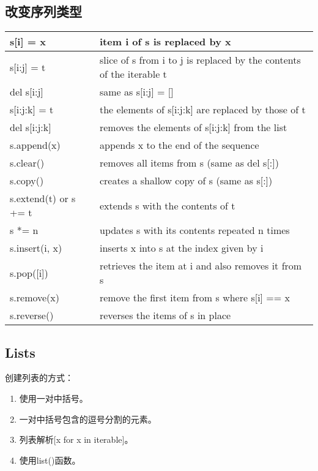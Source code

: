 \subsection{改变序列类型}
\begin{center}
  \begin{tabular}{|l|l|} \hline
    s[i] = x         & item i of s is replaced by x \\\hline
    s[i:j] = t       & slice of s from i to j is replaced by the contents of the iterable t \\\hline
    del s[i:j]       & same as s[i:j] = [] \\\hline
    s[i:j:k] = t     & the elements of s[i:j:k] are replaced by those of t \\\hline
    del s[i:j:k]     & removes the elements of s[i:j:k] from the list \\\hline
    s.append(x)      & appends x to the end of the sequence \\\hline
    s.clear()        & removes all items from s (same as del s[:]) \\\hline
    s.copy()         & creates a shallow copy of s (same as s[:]) \\\hline
    s.extend(t) or s += t & extends s with the contents of t \\\hline
    s *= n           & updates s with its contents repeated n times \\\hline
    s.insert(i, x)   & inserts x into s at the index given by i \\\hline
    s.pop([i])       & retrieves the item at i and also removes it from s \\\hline
    s.remove(x)      & remove the first item from s where s[i] == x \\\hline
    s.reverse()      & reverses the items of s in place \\\hline

  \end{tabular}
\end{center}



\subsection{Lists}
\noindent{\color{red}{list([iterable]):}}
\par{创建列表的方式：}
  \begin{enumerate}
  \item 使用一对中括号。
  \item 一对中括号包含的逗号分割的元素。
  \item 列表解析[x for x in iterable]。
  \item 使用list()函数。
  \end{enumerate}


